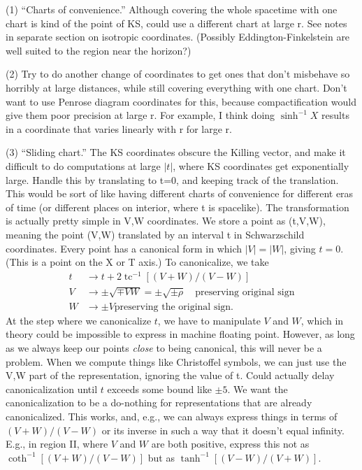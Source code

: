 \documentclass{article}
\begin{document}
(1) ``Charts of convenience.'' Although covering the whole spacetime with one chart is kind of the point of KS,
could use a different chart at large r. See notes in separate section on isotropic coordinates.
(Possibly
Eddington-Finkelstein are well suited to the region near the horizon?)

(2) Try to do another change of coordinates to get ones that don't misbehave so horribly at
large distances, while still covering everything with one chart. Don't want to use Penrose diagram
coordinates for this, because compactification would give them poor precision at large r. For example,
I think doing $\sinh^{-1}X$ results in a coordinate that varies linearly with r for large r. 

(3) ``Sliding chart.'' The KS coordinates obscure the Killing vector, and make it difficult
to do computations at large $|t|$, where KS coordinates get exponentially large.
Handle this by translating to t=0, and keeping track of the translation. This would be sort of like
having different charts of convenience for different eras of time (or different places on interior,
where t is spacelike). The transformation is actually pretty
simple in V,W coordinates. We store a point 
as (t,V,W), meaning the point (V,W) translated by an interval t in Schwarzschild coordinates.
Every point has a canonical form in which $|V|=|W|$, giving $t=0$. (This is a point on the X
or T axis.) To canonicalize, we take
\begin{align*}
  t &\rightarrow t+2\operatorname{tc}^{-1}[(V+W)/(V-W)] \\
  V &\rightarrow \pm\sqrt{\mp VW} = \pm\sqrt{\pm\rho} \quad \text{preserving original sign} \\
  W &\rightarrow \pm V \text{preserving the original sign}.
\end{align*}
At the step where we  canonicalize $t$, we have to manipulate $V$ and $W$, which in theory could
be impossible to express in machine floating point. However, as long as we always keep our points
\emph{close} to being canonical, this will never be a problem. When we compute things like Christoffel
symbols, we can just use the V,W part of the representation, ignoring the value of t. Could actually
delay canonicalization until $t$ exceeds some bound like $\pm5$. We want the canonicalization to be
a do-nothing for representations that are already canonicalized. This works, and, e.g., we can
always express things in terms of $(V+W)/(V-W)$ or its inverse in such a way that it doesn't equal
infinity. E.g., in region II, where $V$ and $W$ are both positive,
express this not as $\coth^{-1}[(V+W)/(V-W)]$ but as
$\tanh^{-1}[(V-W)/(V+W)]$.
\end{document}
